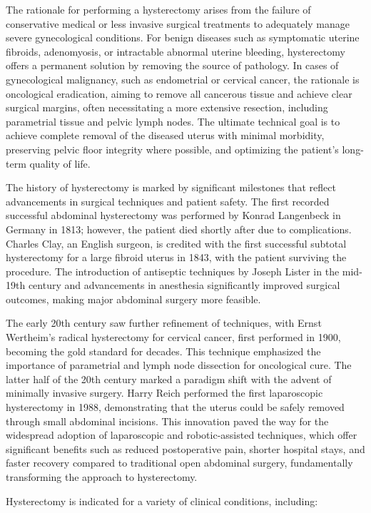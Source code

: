 The rationale for performing a hysterectomy arises from the failure of conservative medical or less invasive surgical treatments to adequately manage severe gynecological conditions. For benign diseases such as symptomatic uterine fibroids, adenomyosis, or intractable abnormal uterine bleeding, hysterectomy offers a permanent solution by removing the source of pathology. In cases of gynecological malignancy, such as endometrial or cervical cancer, the rationale is oncological eradication, aiming to remove all cancerous tissue and achieve clear surgical margins, often necessitating a more extensive resection, including parametrial tissue and pelvic lymph nodes. The ultimate technical goal is to achieve complete removal of the diseased uterus with minimal morbidity, preserving pelvic floor integrity where possible, and optimizing the patient's long-term quality of life.

The history of hysterectomy is marked by significant milestones that reflect advancements in surgical techniques and patient safety. The first recorded successful abdominal hysterectomy was performed by Konrad Langenbeck in Germany in 1813; however, the patient died shortly after due to complications. Charles Clay, an English surgeon, is credited with the first successful subtotal hysterectomy for a large fibroid uterus in 1843, with the patient surviving the procedure. The introduction of antiseptic techniques by Joseph Lister in the mid-19th century and advancements in anesthesia significantly improved surgical outcomes, making major abdominal surgery more feasible.

The early 20th century saw further refinement of techniques, with Ernst Wertheim's radical hysterectomy for cervical cancer, first performed in 1900, becoming the gold standard for decades. This technique emphasized the importance of parametrial and lymph node dissection for oncological cure. The latter half of the 20th century marked a paradigm shift with the advent of minimally invasive surgery. Harry Reich performed the first laparoscopic hysterectomy in 1988, demonstrating that the uterus could be safely removed through small abdominal incisions. This innovation paved the way for the widespread adoption of laparoscopic and robotic-assisted techniques, which offer significant benefits such as reduced postoperative pain, shorter hospital stays, and faster recovery compared to traditional open abdominal surgery, fundamentally transforming the approach to hysterectomy.

Hysterectomy is indicated for a variety of clinical conditions, including:

